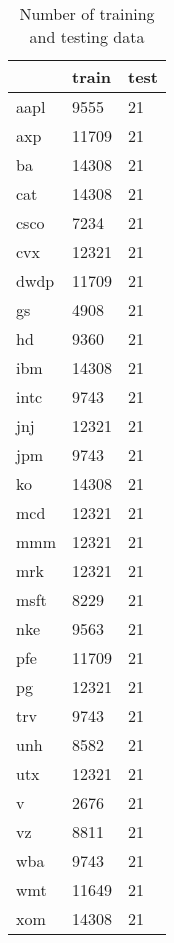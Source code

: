 \begin{table}[H]
 \centering
 \caption{Number of training and testing data} 
\begin{tabularx}{0.5\textwidth}{| X | X | X |}

\hline
 & \textbf{train} &	\textbf{test}  \\ \hline
aapl & 9555 & 21   \\ \hline
axp & 11709 & 21  \\ \hline
ba & 14308 & 21  \\ \hline
cat	&14308 & 21 \\ \hline
csco& 	7234&	21	\\ \hline
cvx&	12321	&21	\\ \hline
dwdp&	11709&	21\\ \hline	
gs	&4908	&21\\ \hline
hd	&9360	&21\\ \hline
ibm	&14308&	21	\\ \hline
intc	&9743&	21\\ \hline
jnj	&12321	&21\\ \hline
jpm	&9743&	21\\ \hline
ko	&14308&	21\\ \hline
mcd	&12321&	21\\ \hline
mmm	&12321&	21\\ \hline
mrk	&12321&	21\\ \hline
msft	&8229&	21\\ \hline
nke	&9563	&21\\ \hline
pfe	&11709&	21\\ \hline
pg	&12321&	21\\ \hline
trv	&9743&	21\\ \hline
unh	&8582&	21\\ \hline
utx	&12321&	21\\ \hline
v	&2676&	21	\\ \hline
vz	&8811&	21\\ \hline
wba	&9743&	21\\ \hline
wmt	&11649&	21\\ \hline
xom	&14308&	21\\ \hline



\end{tabularx}
\label{Pinouts}
\end{table}